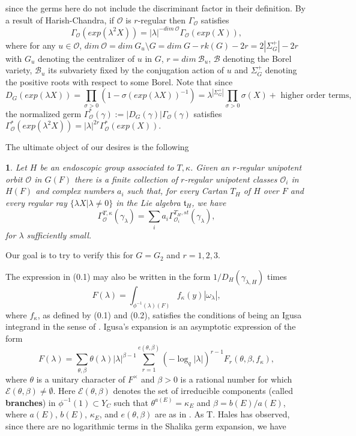 \documentclass[12pt,letterpaper]{amsart}
\newcommand{\proclaimname}{}
\newtheorem*{proclaimx}{\proclaimname}
\newenvironment{proclaim}[1]%
  {\renewcommand{\proclaimname}{#1}\begin{proclaimx}}{\end{proclaimx}}
\begin{document}
since the germs here do not include the discriminant factor
in their definition. By a result of Harish-Chandra, if
${\mathcal O}$ is $r$-regular then $\Gamma_{\mathcal O}$ satisfies
\[
\Gamma_{\mathcal O}(exp(\lambda^2 X))=|\lambda|^{-dim\ {\mathcal O}}
\Gamma_{\mathcal O}(exp( X)),
\]
where for any $u\in {\mathcal O}$,
$dim\ {\mathcal O}=dim\ G_u\setminus G=dim\ G -rk(G)-2r=2|\Sigma^+_G|-2r$ with
$G_u$ denoting the centralizer of $u$ in $G$,
$r=dim\ {\mathcal B}_u$, ${\mathcal B}$ denoting the Borel variety,
${\mathcal B}_u$ its subvariety fixed by the conjugation action of $u$
and $\Sigma^+_G$ denoting the positive roots with respect to some Borel.
Note that since
\[
D_G(exp(\lambda X))=\prod_{\sigma >0}(1-\sigma(exp(\lambda X))^{-1})
=\lambda^{|\Sigma^+_G|}\prod_{\sigma >0}\sigma(X)+\text{ higher order terms},
\]
the normalized germ $\Gamma^*_{\mathcal O}(\gamma)
:=|D_G(\gamma)|\Gamma_{\mathcal O}(\gamma)$ satisfies
$\Gamma^*_{\mathcal O}(exp(\lambda^2 X))
=|\lambda|^{2r}\Gamma^*_{\mathcal O}(exp( X))$.

The ultimate object of our desires is the following

\begin{proclaim}{Matching of Germs Conjecture \cite{LS89}}
Let $H$ be an endoscopic group
associated to $T,\kappa$. Given an $r$-regular
unipotent orbit ${\mathcal O}$ in $G(F)$ there is a finite collection
of $r$-regular unipotent classes ${\mathcal O}_i$ in $H(F)$ and complex
numbers $a_i$ such that, for every Cartan $T_H$ of $H$ over $F$ and every
regular ray $\{\lambda X|\lambda\not=0\}$ in the Lie algebra ${\mathfrak t}_H$,
we have
\[
\Gamma_{{\mathcal O}}^{T,\kappa}(\gamma_\lambda)=
\sum_i a_i\Gamma_{{\mathcal O}_i}^{T_H,st}(\gamma_\lambda ),
\]
for $\lambda$ sufficiently small.
\end{proclaim}

Our goal is to try to verify this for $G=G_2$ and $r=1,2,3$.

The expression in (0.1) may also be written in
the form $1/D_H(\gamma_{\lambda,H})$
times
\[
F(\lambda)=\int_{\phi^{-1}(\lambda)(F)}f_\kappa(y)|\omega_\lambda|,
\tag{0.2}
\]
where $f_\kappa$, as defined by (0.1) and (0.2),
satisfies the conditions of being an Igusa integrand
in the sense of \cite{La83}. Igusa's expansion
\cite{La83} is an asymptotic expression of the form
\[
F(\lambda) =\sum_{\theta,\beta}\theta(\lambda)|\lambda|^{\beta -1}
\sum_{r=1}^{e(\theta,\beta)}(-\log_q|\lambda|)^{r-1}F_r(\theta,\beta,f_\kappa),
\tag{0.3}
\]
where $\theta$ is a unitary character of $F^{\times}$ and $\beta >0$
is a rational number for which ${\mathcal E}(\theta,\beta)\not= \emptyset$.
Here ${\mathcal E}(\theta,\beta)$ denotes the set of irreducible components
(called \textbf{branches}) in $\phi^{-1}(1)\subset Y_C$ such that
$\theta^{a(E)}=\kappa_E$ and $\beta=b(E)/a(E)$, where $a(E)$, $b(E)$,
$\kappa_E$, and $e(\theta,\beta)$ are as in \cite{La83}. As T. Hales
has observed, since there are no logarithmic terms in the
Shalika germ expansion, we have
\end{document}
